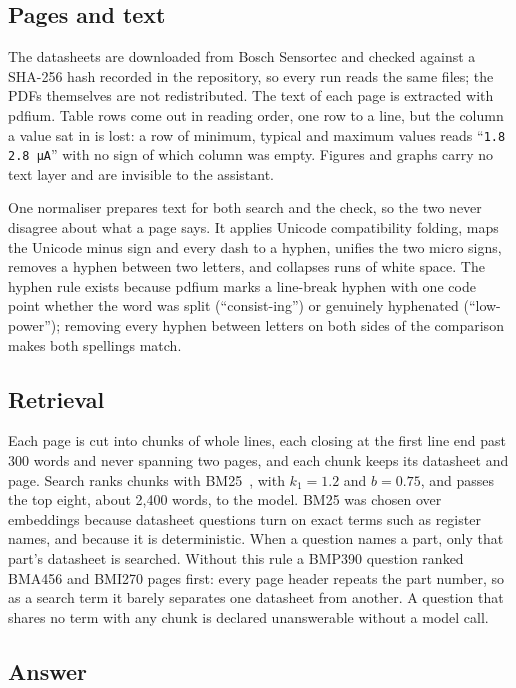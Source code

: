 \subsection{Pages and text}

The datasheets are downloaded from Bosch Sensortec and checked against a SHA-256 hash recorded in the repository, so every run reads the same files; the PDFs themselves are not redistributed. The text of each page is extracted with pdfium. Table rows come out in reading order, one row to a line, but the column a value sat in is lost: a row of minimum, typical and maximum values reads \enquote{\texttt{1.8 2.8 µA}} with no sign of which column was empty. Figures and graphs carry no text layer and are invisible to the assistant.

One normaliser prepares text for both search and the check, so the two never disagree about what a page says. It applies Unicode compatibility folding, maps the Unicode minus sign and every dash to a hyphen, unifies the two micro signs, removes a hyphen between two letters, and collapses runs of white space. The hyphen rule exists because pdfium marks a line-break hyphen with one code point whether the word was split (\enquote{consist-ing}) or genuinely hyphenated (\enquote{low-power}); removing every hyphen between letters on both sides of the comparison makes both spellings match.

\subsection{Retrieval}

Each page is cut into chunks of whole lines, each closing at the first line end past 300 words and never spanning two pages, and each chunk keeps its datasheet and page. Search ranks chunks with BM25~\cite{robertson2009}, with $k_1 = 1.2$ and $b = 0.75$, and passes the top eight, about 2,400 words, to the model. BM25 was chosen over embeddings because datasheet questions turn on exact terms such as register names, and because it is deterministic. When a question names a part, only that part's datasheet is searched. Without this rule a BMP390 question ranked BMA456 and BMI270 pages first: every page header repeats the part number, so as a search term it barely separates one datasheet from another. A question that shares no term with any chunk is declared unanswerable without a model call.

\subsection{Answer}


